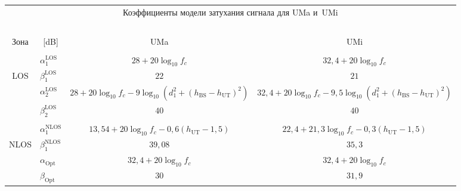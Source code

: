 \begin{multicols}{2}
\begin{figure*}[b]\small
\begin{center}
\tabcolsep=4pt
\begin{tabular}{|c|l|c|c|}

\multicolumn{4}{c}{Коэффициенты модели затухания сигнала для UMa и~UMi}\\
\multicolumn{4}{c}{\ }\\[-6pt]
\hline
 Зона& \multicolumn{1}{c|}{[dB]} & UMa & UMi \\
\hline
&&&\\[-9pt]
 & $\alpha_1^{\mathrm{LOS}}$ & $28+20 \log_{10}{f_c}$ & $32{,}4+20\log_{10}{f_c}$\\
 LOS& $\beta_1^{\mathrm{LOS}}$ & $22$ & $21$\\
 & $\alpha_2^{\mathrm{LOS}}$ & $28+20 \log_{10}{f_c}-9\log_{10}{\left(d_1^2+(h_{\mathrm{BS}}-h_{\mathrm{UT}})^2\right)} $ 
 & $32{,}4+20\log_{10}{f_c}- 9{,}5\log_{10}{\left(d_1^2+(h_{\mathrm{BS}}-h_{\mathrm{UT}})^2\right)}$\\
 & $\beta_2^{\mathrm{LOS}}$ & $40$ & $40$\\
\hline
&&&\\[-9pt]
& $\alpha_1^{\mathrm{NLOS}}$ & $13{,}54+20\log_{10}{f_c}-0{,}6(h_{\mathrm{UT}}-1,5)$ & 
$22{,}4+21{,}3\log_{10}{f_c} - 0{,}3(h_{\mathrm{UT}}-1{,}5)$ \\
NLOS  & $\beta_1^{\mathrm{NLOS}}$ & $39{,}08$ & $35{,}3$\\
 & $\alpha_{\mathrm{Opt}}$ & $32{,}4+20\log_{10}{f_c}$ & $32{,}4+20\log_{10}{f_c} $\\
 & $\beta_{\mathrm{Opt}}$ & $30$ & $31{,}9$\\
 \hline
\end{tabular}
\end{center}
\setcounter{figure}{1}
\vspace*{12pt}
      \begin{center}
     \mbox{%
\epsfxsize=163mm 
}
\end{center}
\vspace*{-10pt}
 \label{fig:1}
 \end{figure*}


\end{multicols}
